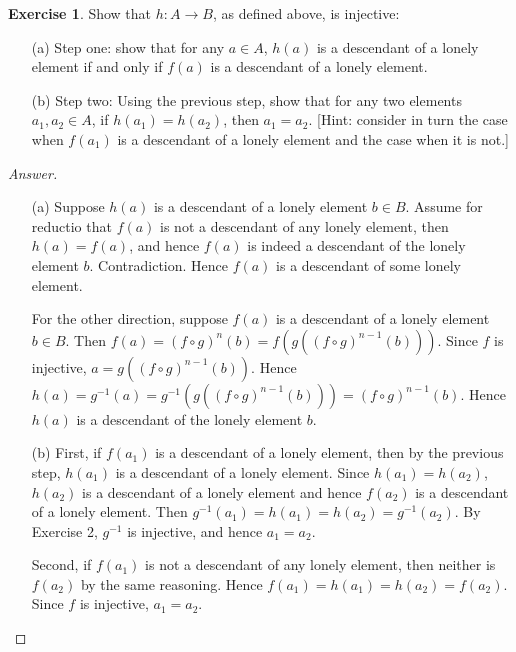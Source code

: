\documentclass[11pt]{article}
\theoremstyle{definition}
\newtheorem{exer}{Exercise}
\begin{document}
\begin{exer}
Show that $h: A \rightarrow B$, as defined above, is injective:
\begin{enumerate}
\item[(a)] Step one: show that for any $a \in A$, $h(a)$ is a descendant of a lonely element if and only if $f(a)$ is a descendant of a lonely element.
\item[(b)] Step two: Using the previous step, show that for any two elements $a_1, a_2 \in A$, if $h(a_1) = h(a_2)$, then $a_1 = a_2$. [Hint: consider in turn the case when $f(a_1)$ is a descendant of a lonely element and the case when it is not.]
\end{enumerate}
\end{exer}

\begin{proof}[Answer]
\begin{enumerate}
\item[(a)] Suppose $h(a)$ is a descendant of a lonely element $b \in B$. Assume for reductio that $f(a)$ is not a descendant of any lonely element, then $h(a) = f(a)$, and hence $f(a)$ is indeed a descendant of the lonely element $b$. Contradiction. Hence $f(a)$ is a descendant of some lonely element. 

For the other direction, suppose $f(a)$ is a descendant of a lonely element $b \in B$. Then $f(a) =  (f \circ g)^n(b) = f(g((f \circ g)^{n-1}(b)))$. Since $f$ is injective, $a = g((f \circ g)^{n-1}(b))$. Hence $h(a) = g^{-1}(a) = g^{-1}(g((f \circ g)^{n-1}(b))) = (f \circ g)^{n-1}(b)$. Hence $h(a)$ is a descendant of the lonely element $b$. 
\item[(b)] First, if $f(a_1)$ is a descendant of a lonely element, then by the previous step, $h(a_1)$ is a descendant of a lonely element. Since $h(a_1) = h(a_2)$, $h(a_2)$ is a descendant of a lonely element and hence $f(a_2)$ is a descendant of a lonely element. Then $g^{-1}(a_1) = h(a_1) = h(a_2) = g^{-1}(a_2)$. By Exercise 2, $g^{-1}$ is injective, and hence $a_1 = a_2$.

Second, if $f(a_1)$ is not a descendant of any lonely element, then neither is $f(a_2)$ by the same reasoning. Hence $f(a_1) = h(a_1) = h(a_2) = f(a_2)$. Since $f$ is injective, $a_1 = a_2$.
\end{enumerate}

\end{proof}
\end{document}
